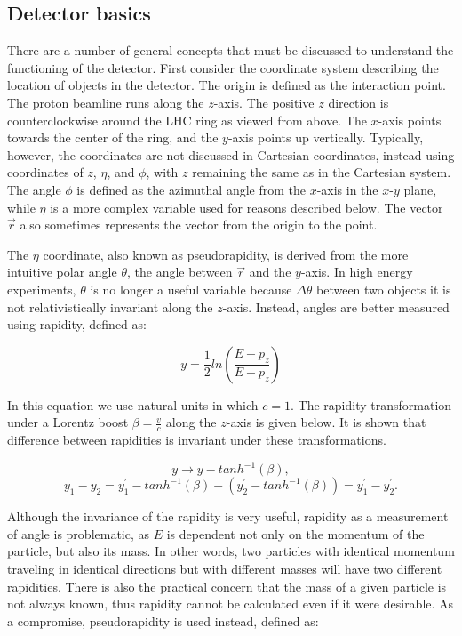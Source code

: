 \subsection{Detector basics}
\label{SECTION-ATLAS-GEO}
There are a number of general concepts that must be discussed to understand the functioning of the detector. First consider the coordinate system describing the location of objects in the detector. The origin is defined as the interaction point. The proton beamline runs along the $z$-axis. The positive $z$ direction is counterclockwise around the LHC ring as viewed from above. The $x$-axis points towards the center of the ring, and the $y$-axis points up vertically. Typically, however, the coordinates are not discussed in Cartesian coordinates, instead using coordinates of $z$, $\eta$, and $\phi$, with $z$ remaining the same as in the Cartesian system. The angle $\phi$ is defined as the azimuthal angle from the $x$-axis in the $x$-$y$ plane, while $\eta$ is a more complex variable used for reasons described below. The vector $\vec{r}$ also sometimes represents the vector from the origin to the point.

The $\eta$ coordinate, also known as pseudorapidity, is derived from the more intuitive polar angle $\theta$, the angle between $\vec{r}$ and the $y$-axis. In high energy experiments, $\theta$ is no longer a useful variable because $\Delta\theta$ between two objects it is not relativistically invariant along the $z$-axis. Instead, angles are better measured using rapidity, defined as:

\begin{equation}
y = \frac{1}{2}ln\left(\frac{E+p_z}{E-p_z}\right)
\end{equation}

\noindent
In this equation we use natural units in which $c=1$. The rapidity transformation under a Lorentz boost $\beta = \frac{v}{c}$ along the $z$-axis is given below. It is shown that difference between rapidities is invariant under these transformations.

\begin{equation}
y \to y-tanh^{-1}(\beta),
\end{equation}
\begin{equation}
y_1 - y_2 = y_1^{\prime} - tanh^{-1}(\beta) - \left( y_2^{\prime} - tanh^{-1}(\beta) \right) = y_1^{\prime} - y_2^{\prime}.
\end{equation}

\noindent
Although the invariance of the rapidity is very useful, rapidity as a measurement of angle is problematic, as $E$ is dependent not only on the momentum of the particle, but also its mass. In other words, two particles with identical momentum traveling in identical directions but with different masses will have two different rapidities. There is also the practical concern that the mass of a given particle is not always known, thus rapidity cannot be calculated even if it were desirable. As a compromise, pseudorapidity is used instead, defined as:

